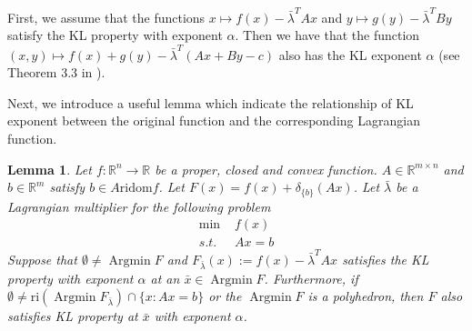 \documentclass{article}
\numberwithin{equation}{section}
\newtheorem{lemma}{Lemma}[section]
\def\Argmin{\mathop{\mathrm{Argmin}}}
\begin{document}
First, we assume that the functions $x \mapsto f(x) - \bar{\lambda}^TAx$ and $y\mapsto g(y) - \bar{\lambda}^TBy$ 
satisfy the KL property with exponent $\alpha$. Then we have that the function $(x,y) \mapsto f(x)+ g(y) -\bar{\lambda}^T(Ax+By-c)$ 
also has the KL exponent $\alpha$ (see Theorem 3.3 in \cite{li2018calculus}). 

Next, we introduce a useful lemma which indicate the relationship of KL exponent between the original function 
and the corresponding Lagrangian function. 
\begin{lemma} \label{lemma_of_Lagrangian_KL_exponent}
    Let $f: \mathbb{R}^n \rightarrow \mathbb{R}$ be a proper, closed and convex function. $A\in \mathbb{R}^{m\times n}$ 
    and $b\in \mathbb{R}^m$ satisfy $b \in A \mathrm{ri} \mathrm{dom} f$. Let $F(x) = f(x) + \delta_{\{b\}}(Ax)$.  
    Let $\bar{\lambda}$ be a Lagrangian multiplier for the following problem
    \begin{align}
        \min\hspace{4pt} &f(x) \nonumber \\
        s.t. \hspace{4pt} & Ax = b \nonumber 
    \end{align}  
    Suppose that $\emptyset \neq \Argmin F$ and $F_{\bar{\lambda}}(x) := f(x) -\bar{\lambda}^TAx$ satisfies the KL property with exponent $\alpha$ 
    at an $\bar{x}\in \Argmin F$. Furthermore, if $\emptyset \neq \mathrm{ri} (\Argmin F_{\bar{\lambda}}) \cap \{x: Ax = b\}$ or the 
    $\Argmin F$ is a polyhedron, then 
    $F$ also satisfies KL property at $\bar{x}$ with exponent $\alpha$. 
\end{lemma}
\end{document}
